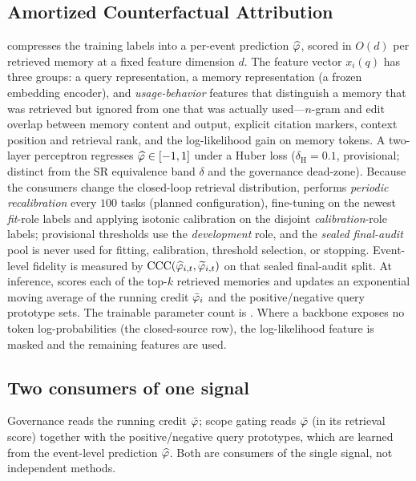 \subsection{Amortized Counterfactual Attribution}
\aca{} compresses the training labels into a per-event prediction $\widehat{\varphi}$, scored
in $O(d)$ per retrieved memory at a fixed feature dimension $d$. The feature vector
$x_i(q)$ has three groups: a query representation, a memory representation (a frozen
embedding encoder), and \emph{usage-behavior} features that distinguish a memory
that was retrieved but ignored from one that was actually used---$n$-gram and edit
overlap between memory content and output, explicit citation markers, context
position and retrieval rank, and the log-likelihood gain on memory tokens. A
two-layer perceptron regresses $\widehat{\varphi} \in [-1, 1]$ under a Huber loss
($\delta_{\mathrm{H}} = 0.1$, provisional; distinct from the SR equivalence band
$\delta$ and the governance dead-zone). Because the consumers change the closed-loop
retrieval distribution, \aca{} performs \emph{periodic recalibration} every $100$
tasks (planned configuration), fine-tuning on the newest \emph{fit}-role labels and
applying isotonic calibration on the disjoint \emph{calibration}-role labels;
provisional thresholds use the \emph{development} role, and the \emph{sealed
final-audit} pool is never used for fitting, calibration, threshold selection, or
stopping. Event-level fidelity is measured by
$\mathrm{CCC}(\widehat{\varphi}_{i,t}, \widetilde{\varphi}_{i,t})$ on that sealed final-audit split. At
inference, \aca{} scores each of the top-$k$ retrieved memories and updates an
exponential moving average of the running credit $\bar{\varphi}_i$ and the
positive/negative query prototype sets. The trainable parameter count is
. Where a backbone exposes no token log-probabilities
(the closed-source row), the log-likelihood feature is masked and the remaining
features are used.

\subsection{Two consumers of one signal}
Governance reads the running credit $\bar{\varphi}$; scope gating reads $\bar{\varphi}$ (in its
retrieval score) together with the positive/negative query prototypes, which are
learned from the event-level prediction $\widehat{\varphi}$. Both are consumers of the single
\aca{} signal, not independent methods.

